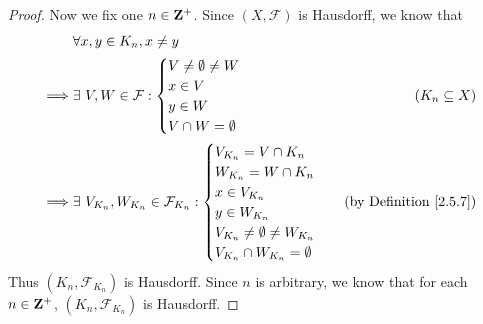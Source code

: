 \begin{proof}
    Now we fix one \(n \in \mathbf{Z}^+\).
    Since \((X, \mathcal{F})\) is Hausdorff, we know that
    \begin{align*}
                 & \forall x, y \in K_n, x \neq y                                                                     \\
        \implies & \exists\ V, W \in \mathcal{F} : \begin{cases}
                                                       V \neq \emptyset \neq W \\
                                                       x \in V                 \\
                                                       y \in W                 \\
                                                       V \cap W = \emptyset
                                                   \end{cases}                   & (K_n \subseteq X)                  \\
        \implies & \exists\ V_{K_n}, W_{K_n} \in \mathcal{F}_{K_n} : \begin{cases}
                                                                         V_{K_n} = V \cap K_n                \\
                                                                         W_{K_n} = W \cap K_n                \\
                                                                         x \in V_{K_n}                       \\
                                                                         y \in W_{K_n}                       \\
                                                                         V_{K_n} \neq \emptyset \neq W_{K_n} \\
                                                                         V_{K_n} \cap W_{K_n} = \emptyset
                                                                     \end{cases} & \text{(by Definition \ref{2.5.7})}
    \end{align*}
    Thus \((K_n, \mathcal{F}_{K_n})\) is Hausdorff.
    Since \(n\) is arbitrary, we know that for each \(n \in \mathbf{Z}^+\), \((K_n, \mathcal{F}_{K_n})\) is Hausdorff.


\end{proof}
